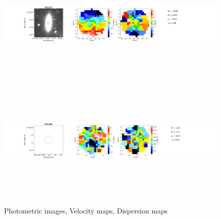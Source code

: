 \documentclass{aa}
\begin{document}
\begin{figure}[!htb]
   \includegraphics[width=21cm,height=6cm,keepaspectratio]{../2_pipeline/1_V&S_Maps/177Velocity_map.pdf}
   \includegraphics[width=21cm,height=6cm,keepaspectratio]{../2_pipeline/1_V&S_Maps/249Velocity_map.pdf}
         \caption{Photometric images, Velocity maps, Dispersion maps}
         \label{FigVelDis}
\end{figure}
\clearpage
%
\end{document}
